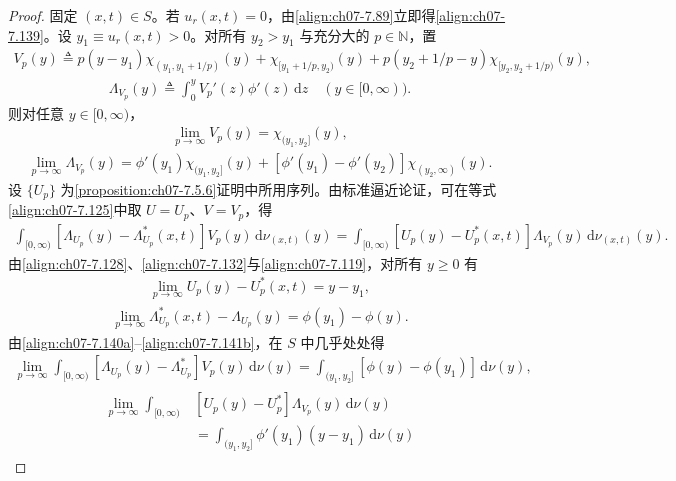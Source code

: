 \documentclass[../../main.tex]{subfiles}%
\begin{document}
\begin{proof}
固定 $(x,t)\in S$。若 $u_r(x,t)=0$，由\eqref{align:ch07-7.89}立即得\eqref{align:ch07-7.139}。设 $y_1\equiv u_r(x,t)>0$。对所有 $y_2>y_1$ 与充分大的 $p\in\mathbb{N}$，置
\begin{align*}
V_p(y)\triangleq p(y-y_1)\chi_{(y_1,y_1+1/p)}(y)+\chi_{[y_1+1/p,y_2)}(y)+p(y_2+1/p-y)\chi_{[y_2,y_2+1/p)}(y),
\end{align*}
\begin{align*}
\Lambda_{V_p}(y)\triangleq \int_0^y V_p'(z)\phi'(z)\,\mathrm{d}z\quad(y\in[0,\infty)).
\end{align*}
则对任意 $y\in[0,\infty)$，
\begin{align}
\lim_{p\to\infty}V_p(y)=\chi_{(y_1,y_2]}(y), \label{align:ch07-7.140a}
\end{align}
\begin{align}
\lim_{p\to\infty}\Lambda_{V_p}(y)=\phi'(y_1)\chi_{(y_1,y_2]}(y)+[\phi'(y_1)-\phi'(y_2)]\chi_{(y_2,\infty)}(y). \label{align:ch07-7.140b}
\end{align}
设 $\{U_p\}$ 为\cref{proposition:ch07-7.5.6}证明中所用序列。由标准逼近论证，可在等式\eqref{align:ch07-7.125}中取 $U=U_p$、$V=V_p$，得
\begin{align*}
\int_{[0,\infty)}[\Lambda_{U_p}(y)-\Lambda_{U_p}^*(x,t)]V_p(y)\,\mathrm{d}\nu_{(x,t)}(y)
=\int_{[0,\infty)}[U_p(y)-U_p^*(x,t)]\Lambda_{V_p}(y)\,\mathrm{d}\nu_{(x,t)}(y).
\end{align*}
由\eqref{align:ch07-7.128}、\eqref{align:ch07-7.132}与\eqref{align:ch07-7.119}，对所有 $y\geqslant0$ 有
\begin{align}
\lim_{p\to\infty}U_p(y)-U_p^*(x,t)=y-y_1, \label{align:ch07-7.141a}
\end{align}
\begin{align}
\lim_{p\to\infty}\Lambda_{U_p}^*(x,t)-\Lambda_{U_p}(y)=\phi(y_1)-\phi(y). \label{align:ch07-7.141b}
\end{align}
由\eqref{align:ch07-7.140a}--\eqref{align:ch07-7.141b}，在 $S$ 中几乎处处得
\begin{align*}
\lim_{p\to\infty}\int_{[0,\infty)}[\Lambda_{U_p}(y)-\Lambda_{U_p}^*]V_p(y)\,\mathrm{d}\nu(y)
=\int_{(y_1,y_2]}[\phi(y)-\phi(y_1)]\,\mathrm{d}\nu(y),
\end{align*}
\begin{align*}
\begin{aligned}
\lim_{p\to\infty}\int_{[0,\infty)}&[U_p(y)-U_p^*]\Lambda_{V_p}(y)\,\mathrm{d}\nu(y)\\
&=\int_{(y_1,y_2]}\phi'(y_1)(y-y_1)\,\mathrm{d}\nu(y)

\end{aligned}
\end{align*}
\end{proof}
\end{document}
